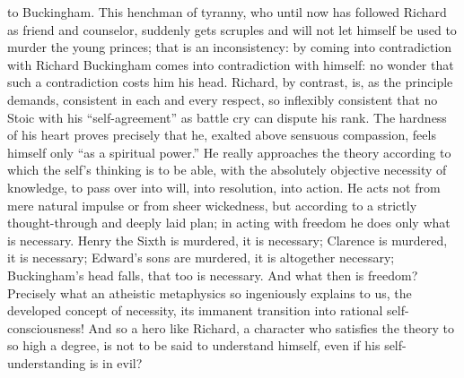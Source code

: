 \documentclass[12pt,a4paper,openany]{book}
\newcommand{\opage}[1]{\marginnote{\footnotesize\textit{[#1]}}}
\begin{document}
to Buckingham. This henchman of tyranny, who
until now has followed Richard as friend and counselor, suddenly
gets scruples and will not let himself be used to murder
the young princes; that is an inconsistency: by coming
into contradiction with Richard Buckingham comes into contradiction
with himself: no wonder that such a
\setcounter{footnote}{0}%
\opage{543}contradiction costs him his head. Richard, by contrast, is,
as the principle demands, consistent in each and every respect, so
inflexibly consistent that no Stoic with his ``self-agreement''
as battle cry can dispute his rank. The hardness of his heart proves precisely that he,
exalted above sensuous compassion, feels himself only ``as
a spiritual power.'' He really approaches the theory
according to which the self's thinking is to be able, with the absolutely
objective necessity of knowledge, to pass over into will, into
resolution, into action. He acts not from mere natural impulse
or from sheer wickedness, but according to a strictly
thought-through and deeply laid plan; in acting with
freedom he does only what is necessary. Henry
the Sixth is murdered, it is necessary; Clarence is murdered,
it is necessary; Edward's sons are murdered, it is altogether
necessary; Buckingham's head falls, that too
is necessary. And what then is freedom? Precisely what
an atheistic metaphysics so ingeniously explains to us, the developed
concept of necessity, its immanent transition
into rational self-consciousness! And so a hero
like Richard, a character who satisfies the
theory to so high a degree, is not to be said to understand himself,
even if his self-understanding is in evil?
\end{document}
